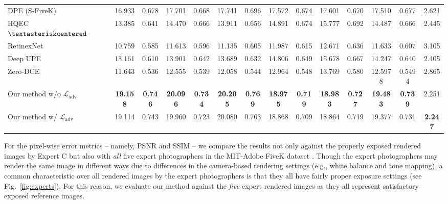 \documentclass[final]{cvpr}
\begin{document}
\begin{table*}
\begin{center}
{\begin{tabular}{|l|c|c|c|c|c|c|c|c|c|c|c|c|c|}
DPE (S-FiveK) \cite{DPE} & 16.933 & 0.678 & 17.701 & 0.668 & 17.741 & \cellcolor[HTML]{FFCCCB}0.696 & 17.572 & 0.674 & 17.601 & 0.670 & 17.510 & 0.677 & 2.621\\
\cellcolor[HTML]{D5D5D5}HQEC \cite{HQEC} $\textasteriskcentered$& 13.385 & 0.641 & 14.470 & 0.666 & 13.911 & 0.656 & 14.891 & 0.674 & 15.777 & 0.692 & 14.487 & 0.666 & 2.445\\
\cellcolor[HTML]{D5D5D5}RetinexNet \cite{Chen2018Retinex}  & 10.759 & 0.585 & 11.613 & 0.596 & 11.135 & 0.605 & 11.987 & 0.615 & 12.671 & 0.636 & 11.633 & 0.607 & 3.105\\
\cellcolor[HTML]{D5D5D5}Deep UPE \cite{DeepUPE} & 13.161 & 0.610 & 13.901 & 0.642 & 13.689 & 0.632 & 14.806 & 0.649 & 15.678 & 0.667 & 14.247 & 0.640  & 2.405\\ 
\cellcolor[HTML]{D5D5D5}Zero-DCE \cite{guo2020zero}  & 11.643  & 0.536 & 12.555 & 0.539 & 12.058 & 0.544 & 12.964  & 0.548 & 13.769 & 0.580 & 12.5978 & 0.5494 & 2.865 \\
\hdashline
Our method w/o $\mathcal{L}_{\text{adv}}$ & \cellcolor[HTML]{79CC7A}\textbf{19.158} & \cellcolor[HTML]{79CC7A}\textbf{0.746} &  \cellcolor[HTML]{79CC7A}\textbf{20.096} & \cellcolor[HTML]{79CC7A}\textbf{0.734} & \cellcolor[HTML]{79CC7A}\textbf{20.205} & \cellcolor[HTML]{79CC7A}\textbf{0.769} & \cellcolor[HTML]{79CC7A}\textbf{18.975} & \cellcolor[HTML]{79CC7A}\textbf{0.719} & \cellcolor[HTML]{79CC7A}\textbf{18.983} & \cellcolor[HTML]{79CC7A}\textbf{0.727} & \cellcolor[HTML]{79CC7A}\textbf{19.483} & \cellcolor[HTML]{79CC7A}\textbf{0.739} & \cellcolor[HTML]{FFFBA3}2.251\\
Our method w/ $\mathcal{L}_{\text{adv}}$ & \cellcolor[HTML]{FFFBA3}19.114 & \cellcolor[HTML]{FFFBA3}0.743 & \cellcolor[HTML]{FFFBA3}19.960 & \cellcolor[HTML]{FFFBA3}0.723 & \cellcolor[HTML]{FFFBA3}20.080 & \cellcolor[HTML]{FFFBA3}0.763 & \cellcolor[HTML]{FFFBA3}18.868 & \cellcolor[HTML]{FFFBA3}0.709 & \cellcolor[HTML]{FFFBA3}18.864 & \cellcolor[HTML]{FFFBA3}0.719 & \cellcolor[HTML]{FFFBA3}19.377 & \cellcolor[HTML]{FFFBA3}0.731 & \cellcolor[HTML]{79CC7A}\textbf{2.247} \\\hline
\end{tabular}
}\end{center}
\vspace{-6mm}
\end{table*}




For the pixel-wise error metrics -- namely, PSNR and SSIM -- we compare the results not only against the properly exposed rendered images by Expert C but also with \textit{all} five expert photographers in the MIT-Adobe FiveK dataset \cite{fivek}. Though the expert photographers may render the same image in different ways due to differences in the camera-based rendering settings (e.g., white balance and tone mapping), a common characteristic over all rendered images by the expert photographers is that they all have fairly proper exposure settings \cite{fivek} (see Fig.~\ref{fig:experts}). For this reason, we evaluate our method against the \textit{five} expert rendered images as they all represent satisfactory exposed reference images.
\end{document}
